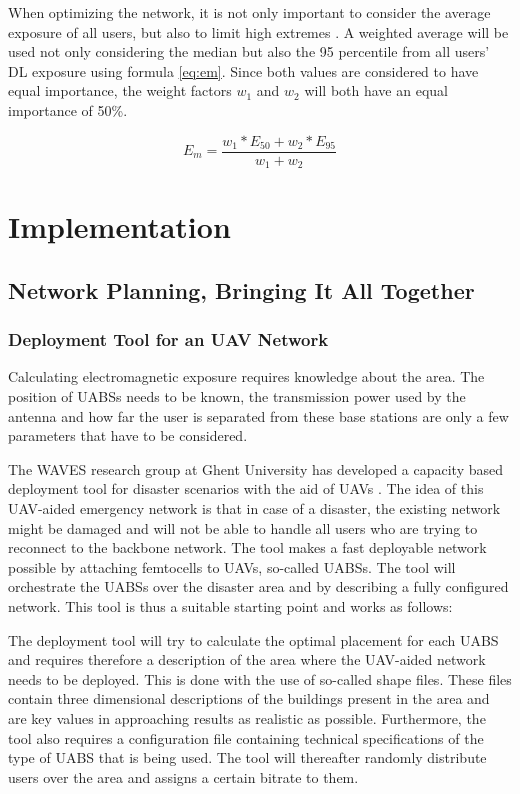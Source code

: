 When optimizing the network, it is not only important to consider the average exposure of all users, but also to limit high extremes \cite{J1}. A weighted average 
will be used not only considering the median but also the 95 percentile from all users' \gls{DL} exposure using formula \ref{eq:em}. 
Since both values are considered to have equal importance, the weight factors $w_1$ and $w_2$ will both have an equal importance of 50\%. 

\begin{equation} 
E_m = \frac{w_1 * E_{50} + w_2 * E_{95}}{w_1 + w_2}
\label{eq:em}
\end{equation}


\section{Implementation}

\subsection{Network Planning, Bringing It All Together}
\label{sec:implementation:deploymenttool}
\subsubsection{Deployment Tool for an UAV Network}

Calculating electromagnetic exposure requires knowledge about the area. The position of \gls{UABS}s needs to be known,
 the transmission power used by the antenna and how far the user is separated from these base stations are only a few parameters
 that have to be considered.

The WAVES research group at Ghent University has developed a capacity based deployment tool for disaster scenarios with the aid of UAVs \cite{J2}.
The idea of this UAV-aided emergency network is that in case of a disaster, the existing network might be damaged and will not be able 
to handle all users who are trying to reconnect to the backbone network. 
The tool makes a fast deployable network possible by attaching femtocells to UAVs, so-called \gls{UABS}s.
The tool will orchestrate the \gls{UABS}s over the disaster area and by describing a fully configured network.
This tool is thus a suitable starting point and works as follows:

The deployment tool will try to calculate the optimal placement for each \gls{UABS} and requires therefore a description of the area where the UAV-aided network needs to 
be deployed. This is done with the use of so-called shape files. These files contain three dimensional descriptions of the buildings present in the area and are
key values in approaching results as realistic as possible. Furthermore, the tool also requires a configuration file containing technical specifications of the type of \gls{UABS} that is being used. 
The tool will thereafter randomly distribute users over the area and assigns a certain bitrate to them.

